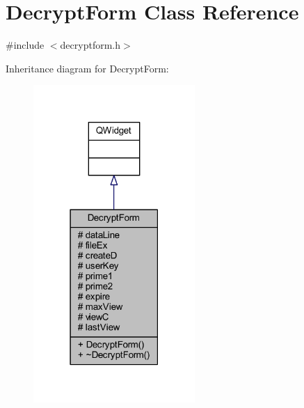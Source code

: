 \hypertarget{class_decrypt_form}{}\section{Decrypt\+Form Class Reference}
\label{class_decrypt_form}


{\ttfamily \#include $<$decryptform.\+h$>$}



Inheritance diagram for Decrypt\+Form\+:\nopagebreak
\begin{figure}[H]
\begin{center}
\leavevmode
\includegraphics[width=174pt]{class_decrypt_form__inherit__graph}
\end{center}
\end{figure}


